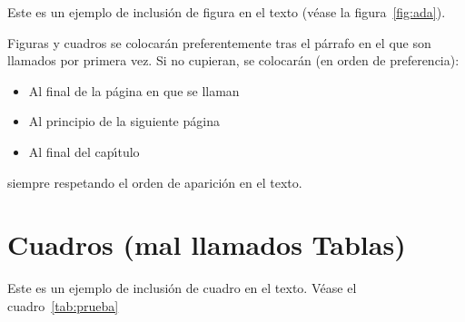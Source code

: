 Este es un ejemplo de inclusi\'on de figura en el texto (v\'ease la figura~\ref{fig:ada}). 


Figuras y cuadros se colocar\'an preferentemente tras el p\'arrafo en el que
son llamados por primera vez. Si no cupieran, se colocar\'an (en orden de preferencia):
\begin{itemize}
 \item Al final de la p\'agina en que se llaman
 \item Al principio de la siguiente p\'agina
 \item Al final del cap{\'\i}tulo
\end{itemize}
siempre respetando el orden de aparici\'on en el texto.

\FloatBarrier
\section{Cuadros (mal llamados Tablas)}

Este es un ejemplo de inclusi\'on de cuadro en el texto. V\'ease el cuadro~\ref{tab:prueba}

